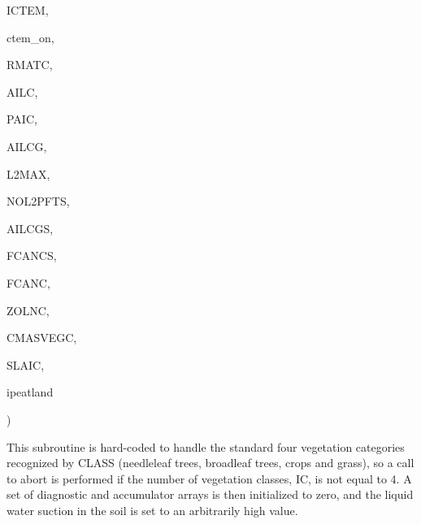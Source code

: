 {\begin{DoxyParamCaption}
\item[{integer}]{I\+C\+T\+E\+M, }
\item[{logical}]{ctem\+\_\+on, }
\item[{real, dimension(ilg,ic,ig)}]{R\+M\+A\+T\+C, }
\item[{real, dimension (ilg,ic)}]{A\+I\+L\+C, }
\item[{real, dimension   (ilg,ic)}]{P\+A\+I\+C, }
\item[{real, dimension(ilg,ictem)}]{A\+I\+L\+C\+G, }
\item[{integer}]{L2\+M\+A\+X, }
\item[{integer, dimension(ic)}]{N\+O\+L2\+P\+F\+T\+S, }
\item[{real, dimension (ilg,ictem)}]{A\+I\+L\+C\+G\+S, }
\item[{real, dimension (ilg,ictem)}]{F\+C\+A\+N\+C\+S, }
\item[{real, dimension(ilg,ictem)}]{F\+C\+A\+N\+C, }
\item[{real, dimension(ilg,ic)}]{Z\+O\+L\+N\+C, }
\item[{real, dimension(ilg,ic)}]{C\+M\+A\+S\+V\+E\+G\+C, }
\item[{real, dimension(ilg,ic)}]{S\+L\+A\+I\+C, }
\item[{integer, dimension (ilg)}]{ipeatland}
\end{DoxyParamCaption}
)}\label{APREP_8f_a5fe4fa336815bc509d646edae0744405}


This subroutine is hard-\/coded to handle the standard four vegetation categories recognized by C\+L\+A\+S\+S (needleleaf trees, broadleaf trees, crops and grass), so a call to abort is performed if the number of vegetation classes, I\+C, is not equal to 4. A set of diagnostic and accumulator arrays is then initialized to zero, and the liquid water suction in the soil is set to an arbitrarily high value. 


